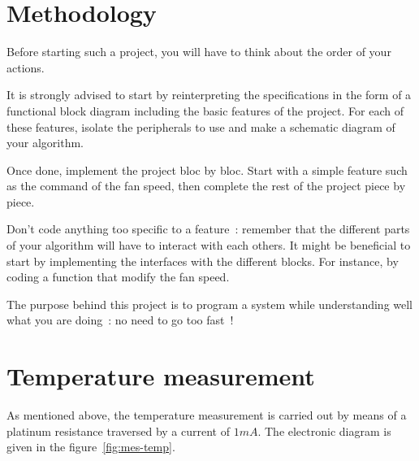 \documentclass[11pt,a4paper]{article}
\theoremstyle{definition}%
\begin{document}
\section{Methodology}
Before starting such a project, you will have to think about the order of your actions.

It is strongly advised to start by reinterpreting the specifications in the form of a functional block diagram including the basic features of the project.
For each of these features, isolate the peripherals to use and make a schematic diagram of your algorithm.

Once done, implement the project bloc by bloc.
Start with a simple feature such as the command of the fan speed, then complete the rest of the project piece by piece.

Don't code anything too specific to a feature~: remember that the different parts of your algorithm will have to interact with each others.
It might be beneficial to start by implementing the interfaces with the different blocks.
For instance, by coding a function that modify the fan speed.

The purpose behind this project is to program a system while understanding well what you are doing~: no need to go too fast~!





\section{Temperature measurement}

As mentioned above, the temperature measurement is carried out by means of a platinum resistance traversed by a current of $ 1 mA $.
The electronic diagram is given in the figure~\ref{fig:mes-temp}.
\end{document}
